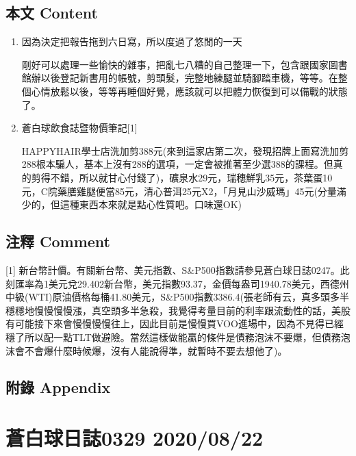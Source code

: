 \documentclass[
]{article}
\begin{document}
\hypertarget{ux672cux6587-content-20}{%
\subsection{本文 Content}\label{ux672cux6587-content-20}}

\begin{enumerate}
\def\labelenumi{\arabic{enumi}.}
\item
  因為決定把報告拖到六日寫，所以度過了悠閒的一天

  剛好可以處理一些愉快的雜事，把亂七八糟的自己整理一下，包含跟國家圖書館辦以後登記新書用的帳號，剪頭髮，完整地練腿並騎腳踏車機，等等。在整個心情放鬆以後，等等再睡個好覺，應該就可以把體力恢復到可以備戰的狀態了。
\item
  蒼白球飲食誌暨物價筆記{[}1{]}

  HAPPYHAIR學士店洗加剪388元(來到這家店第二次，發現招牌上面寫洗加剪288根本騙人，基本上沒有288的選項，一定會被推著至少選388的課程。但真的剪得不錯，所以就甘心付錢了)，礦泉水29元，瑞穗鮮乳35元，茶葉蛋10元，C院藥膳雞腿便當85元，清心普洱25元X2，「月見山沙威瑪」45元(分量滿少的，但這種東西本來就是點心性質吧。口味還OK)
\end{enumerate}

\hypertarget{ux6ce8ux91cb-comment-20}{%
\subsection{注釋 Comment}\label{ux6ce8ux91cb-comment-20}}

{[}1{]}
新台幣計價。有關新台幣、美元指數、S\&P500指數請參見蒼白球日誌0247。此刻匯率為1美元兌29.402新台幣，美元指數93.37，金價每盎司1940.78美元，西德州中級(WTI)原油價格每桶41.80美元，S\&P500指數3386.4(張老師有云，真多頭多半穩穩地慢慢慢慢漲，真空頭多半急殺，我覺得考量目前的利率跟流動性的話，美股有可能接下來會慢慢慢慢往上，因此目前是慢慢買VOO進場中，因為不見得已經穩了所以配一點TLT做避險。當然這樣做能贏的條件是債務泡沫不要爆，但債務泡沫會不會爆什麼時候爆，沒有人能說得準，就暫時不要去想他了)。

\hypertarget{ux9644ux9304-appendix-20}{%
\subsection{附錄 Appendix}\label{ux9644ux9304-appendix-20}}

\hypertarget{ux84bcux767dux7403ux65e5ux8a8c0329-20200822}{%
\section{蒼白球日誌0329
2020/08/22}\label{ux84bcux767dux7403ux65e5ux8a8c0329-20200822}}
\end{document}
